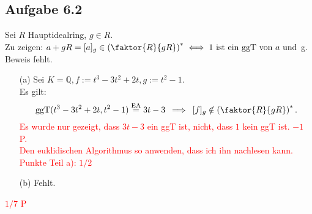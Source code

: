 \documentclass[12pt]{article}
\newcommand{\corr}[1]{\textcolor{red}{#1}}
\newcommand{\df}{\enspace\Longrightarrow\enspace}
\newcommand{\gdw}{\;\Longleftrightarrow\;}
\newcommand{\ggT}{\operatorname{ggT}}
\begin{document}
\subsection*{Aufgabe 6.2}
Sei $R$ Hauptidealring, $g\in R$. \\
Zu zeigen: $a+gR=[a]_g\in\left(\faktor{R}{gR}\right)^*\gdw 1\text{ ist ein $\ggT$ von $a$ und }$g. \\
Beweis fehlt.
\begin{enumerate}
	\item[(a)] Sei $K=\mathbb{Q}, f:=t^3-3t^2+2t,g:=t^2-1$. \\
	Es gilt:
	$$\ggT(t^3-3t^2+2t,t^2-1)\overset{\text{EA}}{=}3t-3 \df [f]_g\notin\left(\faktor{R}{gR}\right)^*.$$
\corr{Es wurde nur gezeigt, dass $3t-3$ ein ggT ist, nicht, dass $1$ kein ggT ist. $-1$ P.}\\
\corr{Den euklidischen Algorithmus so anwenden, dass ich ihn nachlesen kann.}\\
\corr{Punkte Teil a): $1/2$}
	
	\item[(b)] Fehlt.
\end{enumerate}
\corr{$1/7$ P}
\end{document}
